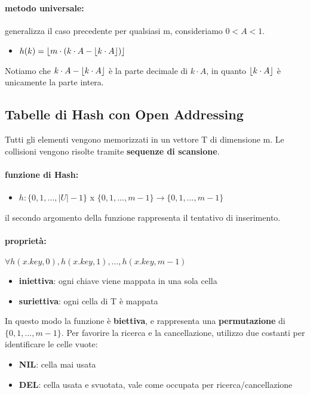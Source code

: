 \documentclass{article}
\DeclarePairedDelimiter\floor{\lfloor}{\rfloor}
\begin{document}
\paragraph{metodo universale:} generalizza il caso precedente per qualsiasi m, consideriamo $0 < A < 1$.
\begin{itemize}
    \item $h(k) = \floor{m \cdot (k \cdot A - \floor{k \cdot A})}$
\end{itemize}
Notiamo che $k \cdot A - \floor{k \cdot A}$ è la parte decimale di $k \cdot A$, in quanto $\floor{k \cdot A}$ è unicamente la parte intera.

\subsection{Tabelle di Hash con Open Addressing} %

Tutti gli elementi vengono memorizzati in un vettore T di dimensione m. Le collisioni vengono risolte 
tramite \textbf{sequenze di scansione}.

\paragraph{funzione di Hash:} 
\begin{itemize}
    \item $h: \{ 0,1,...,|U|-1 \}$ x $\{0,1,...,m-1\}\rightarrow \{0,1,...,m-1\}$
\end{itemize}

il secondo argomento della funzione rappresenta il tentativo di inserimento.

\paragraph{proprietà:} $\forall h(x.key, 0), h(x.key, 1), ... , h(x.key,m-1)$
\begin{itemize}
    \item \textbf{iniettiva}: ogni chiave viene mappata in una sola cella
    \item \textbf{suriettiva}: ogni cella di T è mappata
\end{itemize}
In questo modo la funzione è \textbf{biettiva}, e rappresenta una \textbf{permutazione} di $\{0,1,...,m-1\}$.
Per favorire la ricerca e la cancellazione, utilizzo due costanti per identificare le celle vuote:
\begin{itemize}
    \item \textbf{NIL}: cella mai usata
    \item \textbf{DEL}: cella usata e svuotata, vale come occupata per ricerca/cancellazione
\end{itemize}
\end{document}
